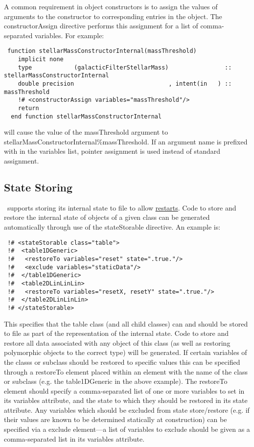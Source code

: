 A common requirement in object constructors is to assign the values of arguments to the constructor to corresponding entries in the object. The {\normalfont \ttfamily constructorAssign} directive performs this assignment for a list of comma-separated variables. For example:
\begin{lstlisting}  
 function stellarMassConstructorInternal(massThreshold)
    implicit none
    type            (galacticFilterStellarMass)                :: stellarMassConstructorInternal
    double precision                           , intent(in   ) :: massThreshold
    !# <constructorAssign variables="massThreshold"/>
    return
  end function stellarMassConstructorInternal
\end{lstlisting}
will cause the value of the {\normalfont \ttfamily massThreshold} argument to {\normalfont \ttfamily stellarMassConstructorInternal\%massThreshold}. If an argument name is prefixed with {\normalfont \ttfamily \textasteriskcentered} in the variables list, pointer assignment is used instead of standard assignment.

\subsection{State Storing}

\glc\ supports storing its internal state to file to allow \href{https://github.com/galacticusorg/galacticus/releases/download/bleeding-edge/Galacticus_Usage.pdf\#sec.Restarting}{restarts}. Code to store and restore the internal state of objects of a given class can be generated automatically through use of the {\normalfont \ttfamily stateStorable} directive. An example is:
\begin{verbatim}
 !# <stateStorable class="table">
 !#  <table1DGeneric>
 !#   <restoreTo variables="reset" state=".true."/>
 !#   <exclude variables="staticData"/>
 !#  </table1DGeneric>
 !#  <table2DLinLinLin>
 !#   <restoreTo variables="resetX, resetY" state=".true."/>
 !#  </table2DLinLinLin>  
 !# </stateStorable>
\end{verbatim}
This specifies that the {\normalfont \ttfamily table} class (and all child classes) can and should be stored to file as part of the representation of the internal state. Code to store and restore all data associated with any object of this class (as well as restoring polymorphic objects to the correct type) will be generated. If certain variables of the classs or subclass should be restored to specific values this can be specified through a {\normalfont \ttfamily restoreTo} element placed within an element with the name of the class or subclass (e.g. the {\normalfont \ttfamily table1DGeneric} in the above example). The {\normalfont \ttfamily restoreTo} element should specify a comma-separated list of one or more variables to set in its {\normalfont \ttfamily variables} attribute, and the state to which they should be restored in its {\normalfont \ttfamily state} attribute. Any variables which should be excluded from state store/restore (e.g. if their values are known to be determined statically at construction) can be specified via a {\normalfont \ttfamily exclude} element---a list of variables to exclude should be given as a comma-separated list in its {\normalfont \ttfamily variables} attribute.

